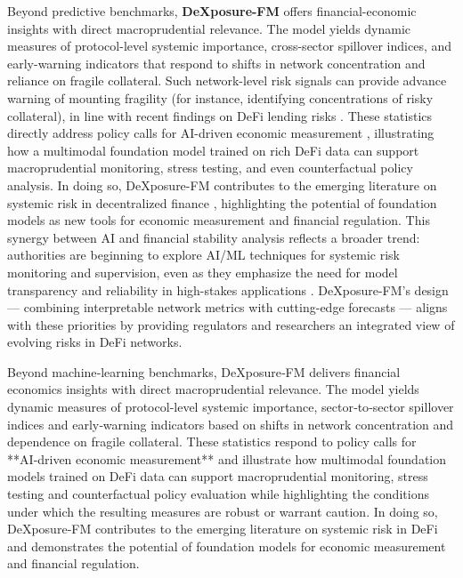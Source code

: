 Beyond predictive benchmarks, \textbf{DeXposure-FM} offers financial-economic insights with direct macroprudential relevance. The model yields dynamic measures of protocol-level systemic importance, cross-sector spillover indices, and early-warning indicators that respond to shifts in network concentration and reliance on fragile collateral. Such network-level risk signals can provide advance warning of mounting fragility (for instance, identifying concentrations of risky collateral), in line with recent findings on DeFi lending risks \cite{Bertomeu2024}. These statistics directly address policy calls for AI-driven economic measurement \cite{nber2025ai}, illustrating how a multimodal foundation model trained on rich DeFi data can support macroprudential monitoring, stress testing, and even counterfactual policy analysis. In doing so, DeXposure-FM contributes to the emerging literature on systemic risk in decentralized finance \cite{naifar2025mapping,zbandut2025institutionalizing,Aufiero2025}, highlighting the potential of foundation models as new tools for economic measurement and financial regulation. This synergy between AI and financial stability analysis reflects a broader trend: authorities are beginning to explore AI/ML techniques for systemic risk monitoring and supervision, even as they emphasize the need for model transparency and reliability in high-stakes applications \cite{FSB2024AI}. DeXposure-FM’s design — combining interpretable network metrics with cutting-edge forecasts — aligns with these priorities by providing regulators and researchers an integrated view of evolving risks in DeFi networks.

Beyond machine‑learning benchmarks, DeXposure‑FM delivers financial economics insights with direct macroprudential relevance.  The model yields dynamic measures of protocol‑level systemic importance, sector‑to‑sector spillover indices and early‑warning indicators based on shifts in network concentration and dependence on fragile collateral.  These statistics respond to policy calls for **AI‑driven economic measurement**   \cite{nber2025ai} and illustrate how multimodal foundation models trained on DeFi data can support macroprudential monitoring, stress testing and counterfactual policy evaluation while highlighting the conditions under which the resulting measures are robust or warrant caution.  In doing so, DeXposure‑FM contributes to the emerging literature on systemic risk in DeFi  \cite{naifar2025mapping,zbandut2025institutionalizing} and demonstrates the potential of foundation models for economic measurement and financial regulation.

